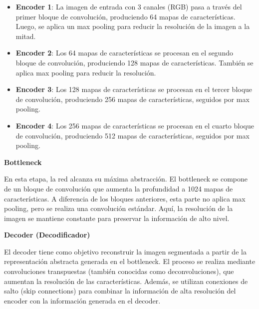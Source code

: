 \begin{enumerate}
\begin{itemize}
\begin{itemize}
    \item \textbf{Encoder 1}: La imagen de entrada con 3 canales (RGB) pasa a través del primer bloque de convolución, produciendo 64 mapas de características. Luego, se aplica un max pooling para reducir la resolución de la imagen a la mitad.
    \item \textbf{Encoder 2}: Los 64 mapas de características se procesan en el segundo bloque de convolución, produciendo 128 mapas de características. También se aplica max pooling para reducir la resolución.
    \item \textbf{Encoder 3}: Los 128 mapas de características se procesan en el tercer bloque de convolución, produciendo 256 mapas de características, seguidos por max pooling.
    \item \textbf{Encoder 4}: Los 256 mapas de características se procesan en el cuarto bloque de convolución, produciendo 512 mapas de características, seguidos por max pooling.
\end{itemize}

\textbf{Bottleneck}

En esta etapa, la red alcanza su máxima abstracción. El bottleneck se compone de un bloque de convolución que aumenta la profundidad a 1024 mapas de características. A diferencia de los bloques anteriores, esta parte no aplica max pooling, pero se realiza una convolución estándar. Aquí, la resolución de la imagen se mantiene constante para preservar la información de alto nivel.

\textbf{Decoder (Decodificador)}

El decoder tiene como objetivo reconstruir la imagen segmentada a partir de la representación abstracta generada en el bottleneck. El proceso se realiza mediante convoluciones transpuestas (también conocidas como deconvoluciones), que aumentan la resolución de las características. Además, se utilizan conexiones de salto (skip connections) para combinar la información de alta resolución del encoder con la información generada en el decoder.


\end{itemize}
\end{enumerate}
